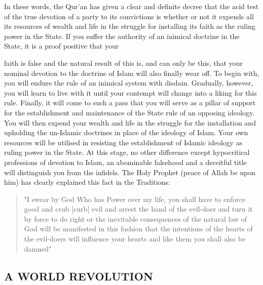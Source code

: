 In these words, the Qur'an has given a clear and definite decree that
the acid test of the true devotion of a party to its convictions is
whether or not it expends all its resources of wealth and life in the
struggle for installing its faith as the ruling power in the State. If
you suffer the authority of an inimical doctrine in the State, it is a
proof positive that your

faith is false and the natural result of this is, and can only be this,
that your nominal devotion to the doctrine of Islam will also finally
wear off. To begin with, you will endure the rule of an inimical system
with disdain. Gradually, however, you will learn to live with it until
your contempt will change into a liking for this rule. Finally, it will
come to such a pass that you will serve as a pillar of support for the
establishment and maintenance of the State rule of an opposing ideology.
You will then expend your wealth and life in the struggle for the
installation and upholding the un-Islamic doctrines in place of the
ideology of Islam. Your own resources will be utilised in resisting the
establishment of Islamic ideology as ruling power in the State. At this
stage, no other difference except hypocritical professions of devotion
to Islam, an abominable falsehood and a deceitful title will distinguish
you from the infidels. The Holy Prophet (peace of Allah be upon him) has
clearly explained this fact in the Traditions:

\begin{quote}
"I swear by God Who has Power over my life, you shall have to enforce
good and crub {[}curb{]} evil and arrest the hand of the evil-doer and
turn it by force to do right or the inevitable consequences of the
natural law of God will be manifested in this fashion that the
intentions of the hearts of the evil-doers will influence your hearts
and like them you shall also be damned"
\end{quote}

\hypertarget{a-world-revolution}{%
\subsection{A WORLD REVOLUTION}\label{a-world-revolution}}

